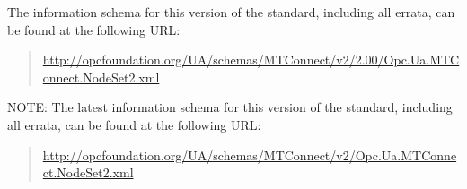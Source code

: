 The information schema for this version of the standard, including all errata, can be found at the following URL:%
\begin{quote}
  \footnotesize{\url{http://opcfoundation.org/UA/schemas/MTConnect/v2/2.00/Opc.Ua.MTConnect.NodeSet2.xml}}
\end{quote}

NOTE:  The latest information schema for this version of the standard, including all errata, can be found at the following URL:%
\begin{quote}
  \footnotesize{\url{http://opcfoundation.org/UA/schemas/MTConnect/v2/Opc.Ua.MTConnect.NodeSet2.xml}}
\end{quote}




